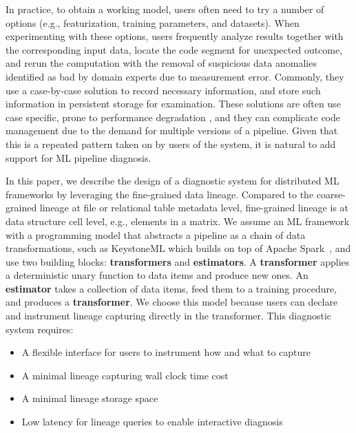 \documentclass{sig-alternate}
\newenvironment{shortlist}{
        \vspace*{-0.5em}
  \begin{itemize}
  \setlength{\itemsep}{-0.1em}
}{
  \end{itemize}
        \vspace*{-0.5em}
}
\begin{document}
In practice, to obtain a working model, users often need to try a number of options (e.g., featurization, training parameters, and datasets). 
When experimenting with these options, users frequently analyze results together with the corresponding input data,  
locate the code segment for unexpected outcome, and rerun the computation with the removal of suspicious data anomalies
identified as bad by domain experts due to measurement error.
Commonly, they use a case-by-case solution to record necessary information, and store such information in persistent storage for examination.
These solutions are often use case specific, prone to performance degradation , and they can complicate code
management due to the demand for multiple versions of a pipeline.
Given that this is a repeated pattern taken on by users of the system, it is natural to add support 
for ML pipeline diagnosis.

In this paper, we describe the design of a diagnostic system for distributed ML frameworks by leveraging the fine-grained data lineage.
Compared to the coarse-grained lineage at file or relational table metadata level, fine-grained lineage is at data structure cell level, e.g., elements in a matrix. 
We assume an ML framework with a programming model that abstracts a pipeline as a chain of data transformations, such as KeystoneML
which builds on top of Apache Spark~\cite{zaharia12}, and use two building blocks: {\bf transformers} and {\bf estimators}.
A {\bf transformer} applies a deterministic unary function to data items and produce new ones.
An {\bf estimator} takes a collection of data items, feed them to a training procedure,  and produces a {\bf transformer}.
We choose this model because users can declare and instrument lineage capturing directly in the transformer.
This diagnostic system requires:
\begin{shortlist}
\item{} A flexible interface for users to instrument how and what to capture
\item{} A minimal lineage capturing wall clock time cost
\item{} A minimal lineage storage space
\item{} Low latency for lineage queries to enable interactive diagnosis
\end{shortlist}
\end{document}
